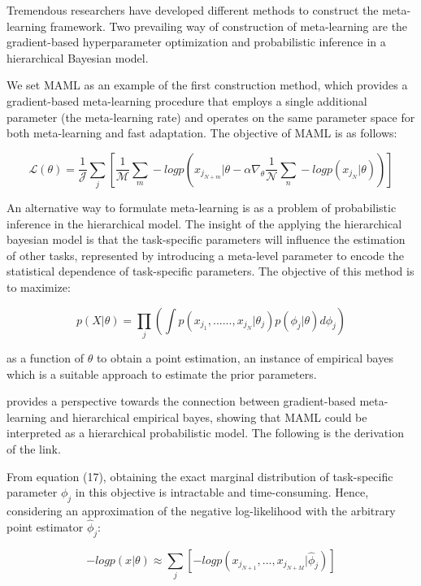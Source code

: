 \documentclass{article}
\begin{document}
Tremendous researchers have developed different methods to construct the meta-learning framework. Two prevailing way of construction of meta-learning are the gradient-based hyperparameter optimization and probabilistic inference in a hierarchical Bayesian model. 

We set MAML \cite{MLHB} as an example of the first construction method, which provides a gradient-based meta-learning procedure that employs a single additional parameter (the meta-learning rate) and operates on the same parameter space for both meta-learning and fast adaptation. The objective of MAML is as follows:

\begin{equation}
  \mathcal{L} (\mathcal{\theta}) = \frac{1}{\mathcal{J}} \sum_j [\frac{1}{\mathcal{M}} \sum_m -logp(x_{j_{N+m}} | \mathcal{\theta} - \alpha \nabla_{\mathcal{\theta}} \frac{1}{\mathcal{N}} \sum_n -logp(x_{j_N} | \mathcal{\theta}))]
\end{equation}

An alternative way to formulate meta-learning is as a problem of probabilistic inference in the hierarchical model. The insight of the applying the hierarchical bayesian model is that the task-specific parameters will influence the estimation of other tasks, represented by introducing a meta-level parameter to encode the statistical dependence of task-specific parameters. The objective of this method is to maximize: 

\begin{equation}
  p(X | \theta) = \prod_j (\int p(x_{j_1},......,x_{j_N} | \theta_j) p(\phi_j | \theta) d\phi_j)
\end{equation}

as a function of $\theta$ to obtain a point estimation, an instance of empirical bayes which is a suitable approach to estimate the prior parameters.

\cite{MLHB} provides a perspective towards the connection between gradient-based meta-learning and hierarchical empirical bayes, showing that MAML could be interpreted as a hierarchical probabilistic model. The following is the derivation of the link. 

From equation (17), obtaining the exact marginal distribution of task-specific parameter $\phi_j$ in this objective is intractable and time-consuming. Hence, considering an approximation of the negative log-likelihood with the arbitrary point estimator $\hat{\phi}_j$:

\begin{equation}
  -log p (x|\theta) \approx \sum_j [-log p (x_{j_{N+1}},...,x_{j_{N+M}}|\hat{\phi}_j)]
\end{equation}
\end{document}
